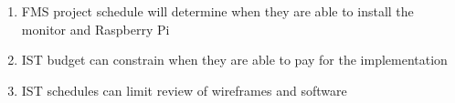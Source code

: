 \begin{enumerate}
	\item FMS project schedule will determine when they are able to install the monitor and Raspberry Pi
	\item IST budget can constrain when they are able to pay for the implementation 
	\item IST schedules can limit review of wireframes and software
\end{enumerate}